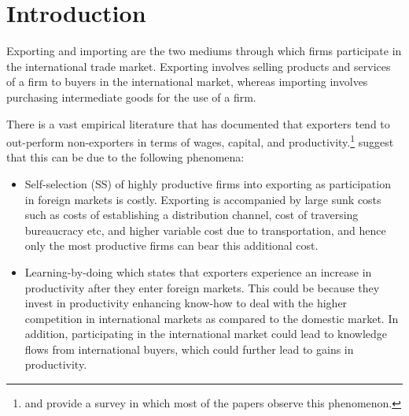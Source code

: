 \documentclass[12pt]{article}
\begin{document}
%

\newpage


\small

\tableofcontents

\newpage
{}
\section{Introduction}\label{sec:introduction}

Exporting and importing are the two mediums through which firms
participate in the international trade market. Exporting involves
selling products and services of a firm to buyers in the international
market, whereas importing involves purchasing intermediate goods for
the use of a firm.  


There is a vast empirical literature  that has documented that exporters tend to
out-perform non-exporters  in terms of wages, capital, and
productivity.\footnote{\textcite{wagner2007exports} and
  \textcite{bernard2007firms} provide a  survey in which most of the
  papers observe this phenomenon.} \textcite{bernard1999exceptional}  suggest that this can be due
to the following phenomena:
\begin{itemize}
\item Self-selection (SS) of highly productive firms into exporting as  
participation in foreign markets is costly. Exporting is accompanied by large
sunk costs
such as costs of establishing a distribution channel,
cost of traversing bureaucracy etc, and higher variable cost due to 
transportation, and hence only the most productive firms can bear this
additional cost. 
\item Learning-by-doing which states that exporters experience an
  increase in productivity after they enter foreign markets. This
  could be because  they invest in productivity enhancing know-how
 to deal with the higher competition in international markets as compared to
the domestic market. In addition, participating in the
international market could lead to knowledge flows from international
buyers, which could further lead to gains in productivity.
\end{itemize}
\end{document}

